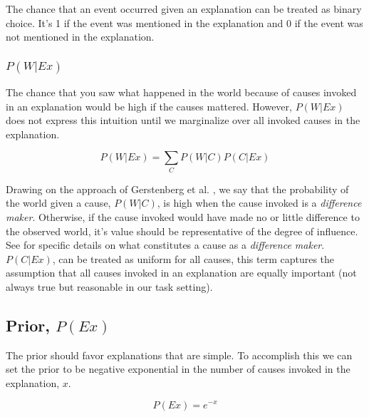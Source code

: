 \documentclass[11pt,a4paper]{article}
\begin{document}
The chance that an event occurred given an explanation can be treated as binary choice. It's 1 if the event was mentioned in the explanation and 0 if the event was not mentioned in the explanation.

\subsubsection{$P(W|Ex)$}

The chance that you saw what happened in the world because of causes invoked in an explanation would be high if the causes mattered. However, $P(W|Ex)$ does not express this intuition until we marginalize over all invoked causes in the explanation. 

\begin{equation}
P(W|Ex) = \sum_{C} P(W|C)P(C|Ex)
\end{equation}


Drawing on the approach of Gerstenberg et al. \citep{gerstenberg2015whether}, we say that the probability of the world given a cause, $P(W|C)$, is high when the cause invoked is a \textit{difference maker}. Otherwise, if the cause invoked would have made no or little difference to the observed world, it's value should be representative of the degree of influence. See \citep{gerstenberg2015whether} for specific details on what constitutes a cause as a \textit{difference maker}. $P(C|Ex)$, can be treated as uniform for all causes, this term captures the assumption that all causes invoked in an explanation are equally important (not always true but reasonable in our task setting).

\subsection{Prior, $P(Ex)$}
The prior should favor explanations that are simple. To accomplish this we can set the prior to be negative exponential in the number of causes invoked in the explanation, $x$. 

\begin{equation}
P(Ex) = e^{-x} 
\end{equation}



\end{document}
